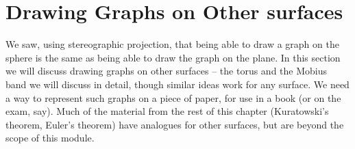 \documentclass[10pt,]{book}
\theoremstyle{plain}
\theoremstyle{definition}
\theoremstyle{definition}
\theoremstyle{definition}
\theoremstyle{definition}
\numberwithin{equation}{section}
\begin{document}
\section[{Drawing Graphs on Other surfaces}]{Drawing Graphs on Other surfaces}\label{s_graphs_on_surfaces_other_surfaces}
\hypertarget{p-292}{}%
We saw, using stereographic projection, that being able to draw a graph on the sphere is the same as being able to draw the graph on the plane.  In this section we will discuss drawing graphs on other surfaces -- the torus and the Mobius band we will discuss in detail, though similar ideas work for any surface.  We need a way to represent such graphs on a piece of paper, for use in a book (or on the exam, say).  Much of the material from the rest of this chapter (Kuratowski's theorem, Euler's theorem) have analogues for other surfaces, but are beyond the scope of this module.%
\end{document}

